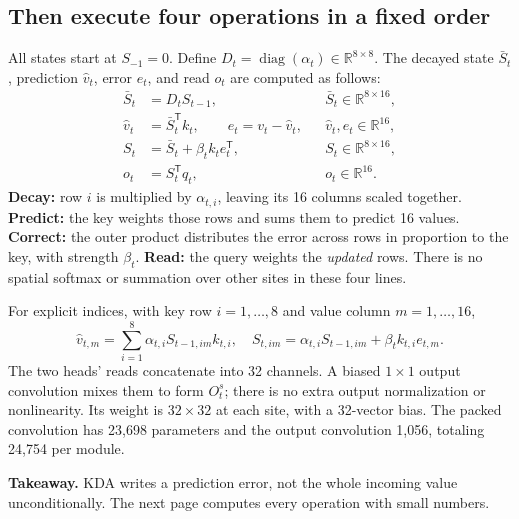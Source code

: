 \documentclass[10pt,letterpaper]{article}
\newcommand{\R}{\mathbb{R}}
\newcommand{\takeaway}[1]{\par\smallskip\noindent\textbf{Takeaway.} #1}
\begin{document}
\subsection{Then execute four operations in a fixed order}
All states start at $S_{-1}=0$. Define $D_t=\operatorname{diag}(\alpha_t)\in\R^{8\times8}$. The decayed state $\bar S_t$, prediction $\widehat v_t$, error $e_t$, and read $o_t$ are computed as follows:
\begin{align}
\bar S_t &=D_tS_{t-1}, &&\bar S_t\in\R^{8\times16}, \label{eq:decay}\\
\widehat v_t&=\bar S_t^{\mathsf T}k_t,\qquad e_t=v_t-\widehat v_t,
&&\widehat v_t,e_t\in\R^{16},\\
S_t&=\bar S_t+\beta_t k_te_t^{\mathsf T}, &&S_t\in\R^{8\times16},\label{eq:write}\\
o_t&=S_t^{\mathsf T}q_t, &&o_t\in\R^{16}.\label{eq:read}
\end{align}
\textbf{Decay:} row $i$ is multiplied by $\alpha_{t,i}$, leaving its 16 columns scaled together. \textbf{Predict:} the key weights those rows and sums them to predict 16 values. \textbf{Correct:} the outer product distributes the error across rows in proportion to the key, with strength $\beta_t$. \textbf{Read:} the query weights the \emph{updated} rows. There is no spatial softmax or summation over other sites in these four lines.

For explicit indices, with key row $i=1,\ldots,8$ and value column $m=1,\ldots,16$,
\begin{equation}
\widehat v_{t,m}=\sum_{i=1}^{8}\alpha_{t,i}S_{t-1,i m}k_{t,i},\quad
S_{t,i m}=\alpha_{t,i}S_{t-1,i m}+\beta_t k_{t,i}e_{t,m}.
\end{equation}
The two heads' reads concatenate into 32 channels. A biased $1\times1$ output convolution mixes them to form $O_t^s$; there is no extra output normalization or nonlinearity. Its weight is $32\times32$ at each site, with a 32-vector bias. The packed convolution has 23,698 parameters and the output convolution 1,056, totaling 24,754 per module.
\takeaway{KDA writes a prediction error, not the whole incoming value unconditionally. The next page computes every operation with small numbers.}
\end{document}
